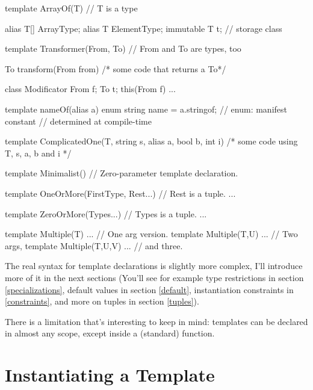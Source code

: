 \begin{ndcode}
template ArrayOf(T) // T is a type
{
    alias T[] ArrayType;
    alias T ElementType;
    immutable T t; // storage class

}

template Transformer(From, To) // From and To are types, too
{
    To transform(From from) { /* some code that returns a To*/}

    class Modificator
    {
        From f;
        To t;
        this(From f) { ... }
    }
}

template nameOf(alias a)
{
    enum string name = a.stringof; // enum: manifest constant
                                   // determined at compile-time
}

template ComplicatedOne(T, string s, alias a, bool b, int i)
{ /* some code using T, s, a, b and i */ }

template Minimalist() {} // Zero-parameter template declaration.

template OneOrMore(FirstType, Rest...) // Rest is a tuple.
{ ... }

template ZeroOrMore(Types...) // Types is a tuple.
{ ... }

template Multiple(T)     { ... } // One arg version.
template Multiple(T,U)   { ... } // Two args,
template Multiple(T,U,V) { ... } // and three.
\end{ndcode}

The real syntax for template declarations is slightly more complex, I'll introduce more of it in the next sections (You'll see for example type restrictions in section \ref{specializations}, default values in section \ref{default}, instantiation constraints in \ref{constraints}, and more on tuples in section \ref{tuples}).

There is a limitation that's interesting to keep in mind: templates can be declared in almost any scope, except inside a (standard) function.


\section{Instantiating a Template}\label{instantiating}

